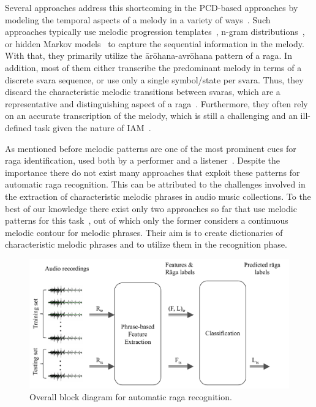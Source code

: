 Several approaches address this shortcoming in the PCD-based approaches by modeling the temporal aspects of a melody in a variety of ways~\cite{kumar2014identifying, shetty2009raga, rajkumar2011identification}. Such approaches typically use melodic progression templates~\cite{shetty2009raga}, n-gram distributions~\cite{kumar2014identifying}, or hidden Markov models~\cite{rajkumar2011identification} to capture the sequential information in the melody. With that, they primarily utilize the \={a}r\={o}hana-avr\={o}hana pattern of a \gls{raga}. In addition, most of them either transcribe the predominant melody in terms of a discrete svara sequence, or use only a single symbol/state per svara. Thus, they discard the characteristic melodic transitions between svaras, which are a representative and distinguishing aspect of a \gls{raga}~\cite{rao1999raga}. Furthermore, they often rely on an accurate transcription of the melody, which is still a challenging and an ill-defined task given the nature of IAM~\cite{rao2012culture, Suvarnalata2014}. 

As mentioned before melodic patterns are one of the most prominent cues for \gls{raga} identification, used both by a performer and a listener~\citep{rao1999raga}. Despite the importance there do not exist many approaches that exploit these patterns for automatic \gls{raga} recognition. This can be attributed to the challenges involved in the extraction of characteristic melodic phrases in audio music collections. To the best of our knowledge there exist only two approaches so far that use melodic patterns for this task~\cite{shrey_ISMIR_2015, sridhar2009raga}, out of which only the former considers a continuous melodic contour for melodic phrases. Their aim is to create dictionaries of characteristic melodic phrases and to utilize them in the recognition phase. 

\begin{figure}
	\begin{center}
		\includegraphics[width=\figSizeHundred]{ch07_ragaRecognition/figures/bd_overall_phasebased_raga_recognition.pdf}
	\end{center}
	\caption{Overall block diagram for automatic \gls{raga} recognition.}
	\label{fig:bd_raga_recognition}
\end{figure}



